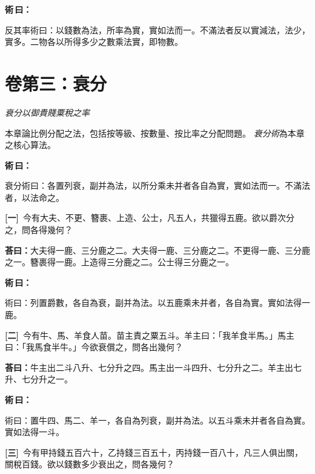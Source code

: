 \documentclass[11pt,a4paper]{article}
\newenvironment{method}{%
  \par\noindent\textcolor{methodcolor}{\textbf{術\,曰：}}%
  \ignorespaces
}{\par\vspace{0.5em}}
\newcommand{\problemnum}[1]{\textbf{[\ignorespaces#1\unskip]}}
\begin{document}
\begin{method}
反其率術曰：以錢數為法，所率為實，實如法而一。不滿法者反以實減法，法少，實多。二物各以所得多少之數乘法實，即物數。
\end{method}


\newpage


\section{卷第三：衰分}
\label{sec:cuifen}

\begin{center}
\textit{衰分以御貴賤粟稅之率}
\end{center}

\noindent 本章論比例分配之法，包括按等級、按數量、按比率之分配問題。
\textit{衰分術}為本章之核心算法。

\bigskip


\begin{method}
衰分術曰：各置列衰，副并為法，以所分乘未并者各自為實，實如法而一。不滿法者，以法命之。
\end{method}

\noindent\problemnum{一}\,
今有大夫、不更、簪裹、上造、公士，凡五人，共獵得五鹿。欲以爵次分之，問各得幾何？

\noindent\textcolor{answercolor}{\textbf{荅曰：}}大夫得一鹿、三分鹿之二。大夫得一鹿、三分鹿之二。不更得一鹿、三分鹿之一。簪裹得一鹿。上造得三分鹿之二。公士得三分鹿之一。

\begin{method}
術曰：列置爵數，各自為衰，副并為法。以五鹿乘未并者，各自為實。實如法得一鹿。
\end{method}

\noindent\problemnum{二}\,
今有牛、馬、羊食人苗。苗主責之粟五斗。羊主曰：「我羊食半馬。」馬主曰：「我馬食半牛。」今欲衰償之，問各出幾何？

\noindent\textcolor{answercolor}{\textbf{荅曰：}}牛主出二斗八升、七分升之四。馬主出一斗四升、七分升之二。羊主出七升、七分升之一。

\begin{method}
術曰：置牛四、馬二、羊一，各自為列衰，副并為法。以五斗乘未并者各自為實。實如法得一斗。
\end{method}

\noindent\problemnum{三}\,
今有甲持錢五百六十，乙持錢三百五十，丙持錢一百八十，凡三人俱出關，關稅百錢。欲以錢數多少衰出之，問各幾何？
\end{document}
